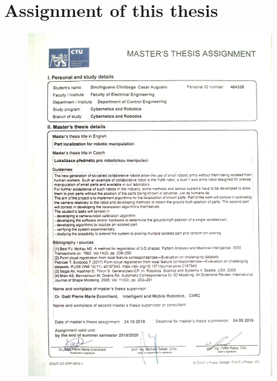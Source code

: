 
\appendix
\chapter*{Assignment of this thesis}
\label{chap:appB}
%

\begin{figure}[!h]
\begin{center}
\includegraphics[width=4.2in]{doc1.jpg}
\end{center}
\end{figure}


